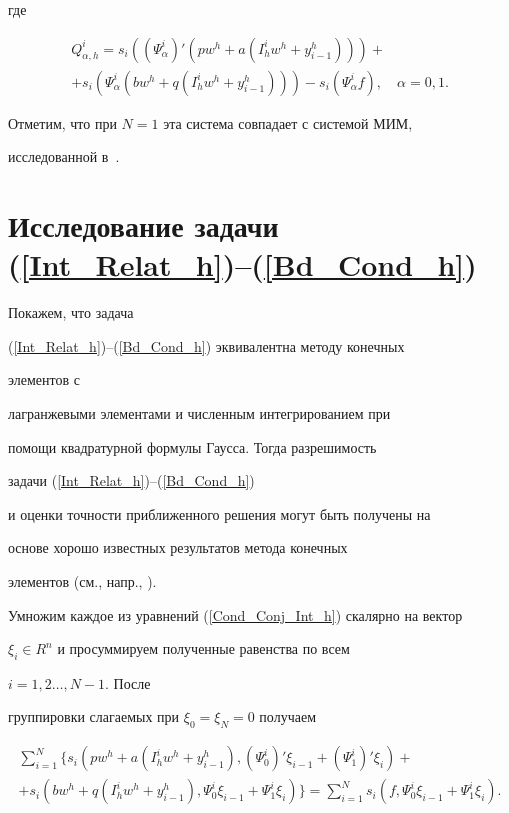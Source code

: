 где


\begin{multline}


Q_{\alpha,h}^i=s_i((\Psi_\alpha^i)'(pw^h+a(I_h^i w^h+y_{i-1}^h))) +\\


+s_i(\Psi_\alpha^i


(bw^h+q(I_h^i w^h+y_{i-1}^h)))-s_i(\Psi_\alpha^i f),\quad \alpha =0,1.


\end{multline}


Отметим, что при $N=1$ эта система совпадает с системой МИМ,


исследованной в~\cite{DautPaim}.








\section{Исследование задачи (\ref{Int_Relat_h})--(\ref{Bd_Cond_h})}





Покажем, что задача


(\ref{Int_Relat_h})--(\ref{Bd_Cond_h}) эквивалентна методу конечных


элементов с


лагранжевыми элементами и численным интегрированием при


помощи квадратурной формулы Гаусса. Тогда разрешимость 


задачи (\ref{Int_Relat_h})--(\ref{Bd_Cond_h})


и оценки точности приближенного решения могут быть получены на


основе хорошо известных результатов метода конечных


элементов (см., напр., \cite{Ciarlet}).





Умножим каждое из уравнений (\ref{Cond_Conj_Int_h}) скалярно на вектор


$\xi_i\in R^n$ и просуммируем полученные равенства по всем


$i=1,2 \dotsc, N-1$. После


группировки слагаемых при $\xi_0=\xi_N=0$ получаем


\begin{multline}\label{FEM_prep}


\sum_{i=1}^N \{ s_i(pw^h+a(I_h^i w^h+y_{i-1}^h),


(\Psi_0^i)'\xi_{i -1}+(\Psi_1^i)'\xi_i) +\\


+s_i(bw^h+q(I_h^i w^h+y_{i-1}^h),\Psi_0^i \xi_{i-1} +


\Psi_1^i \xi_i) \}=


\sum_{i=1}^N {s_i(f,\Psi_0^i \xi_{i-1}+\Psi_1^i \xi_i) }.


\end{multline}


